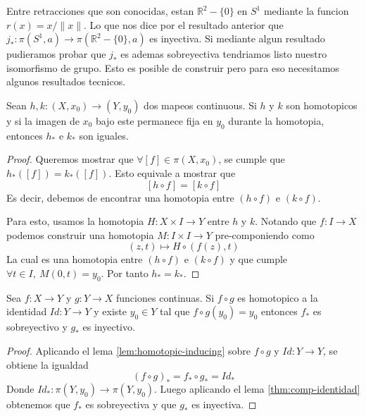 Entre retracciones que son conocidas, estan \(\mathbb R ^2 - \{0\}\) en
\(S^1\) mediante la funcion \(r (x) = x / \lVert x \rVert \). Lo que nos
dice por el resultado anterior que \(j_{*} : \pi (S^1, a) \to \pi
(\mathbb R ^2 - \{0\}, a)\) es inyectiva. Si mediante algun resultado
pudieramos probar que \(j_{*}\) es ademas sobreyectiva tendriamos listo
nuestro isomorfismo de grupo. Esto es posible de construir pero para eso
necesitamos algunos resultados tecnicos.

\begin{lema} \label{lem:homotopic-inducing}
  Sean \(h,k : (X, x_0) \to (Y, y_0)\) dos mapeos continuous. Si \(h\) y
  \(k\) son homotopicos y si la imagen de \(x_0\) bajo este permanece
  fija en \(y_0\) durante la homotopia, entonces \(h_*\) e \(k_*\) son iguales.
\end{lema}
\begin{proof}
  Queremos mostrar que \(\forall [f] \in \pi (X,x_0)\), se cumple que
  \(h_* ([f]) = k_* ([f])\). Esto equivale a mostrar que
  \[ [h \circ f] = [k \circ f] \]
  Es decir, debemos de encontrar una homotopia entre \((h \circ f)\) e \(
  (k \circ f)\).

  Para esto, usamos la homotopia \(H : X \times I \to Y \) entre \(h\) y
  \(k\). Notando que \(f : I \to X\) podemos construir una homotopia \(M
  : I \times I \to Y \) pre-componiendo como
  \[ (z, t) \mapsto H \circ (f(z), t) \]
  La cual es una homotopia entre \((h \circ f)\) e \((k \circ f)\) y que
  cumple \( \forall t \in I,\ M (0, t) = y_0\). Por tanto \(h_* = k_*\).
\end{proof}
\begin{teorema} \label{thm:comp-identidad-homotopia}
  Sea \(f : X \to Y\) y \(g : Y \to X\) funciones continuas. Si \(f
  \circ g\) es homotopico a la identidad \( Id : Y \to Y\) y existe
  \(y_0 \in Y\) tal que \( f \circ g (y_0) = y_0 \) entonces
  \(f_*\) es sobreyectivo y \(g_*\) es inyectivo.
\end{teorema}
\begin{proof}
  Aplicando el lema \ref{lem:homotopic-inducing} sobre \(f \circ g \) y
  \( Id : Y \to Y\), se obtiene la igualdad
  \[ (f \circ g)_{*} = f_* \circ g_* = Id_* \]
  Donde \(Id_* : \pi (Y, y_0) \to \pi (Y, y_0)\). Luego aplicando el lema
  \ref{thm:comp-identidad} obtenemos que \(f_*\) es sobreyectiva y que
  \(g_*\) es inyectiva.
\end{proof}

